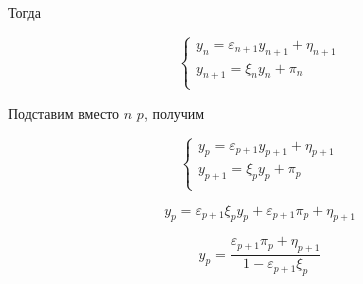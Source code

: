 Тогда

\begin{equation*}
    \begin{cases}
        y_n = \varepsilon_{n+1}y_{n+1}+\eta_{n+1} \\
        y_{n+1} = \xi_{n}y_{n} + \pi_{n} \\
    \end{cases}
\end{equation*}

Подставим вместо $n$ $p$, получим

\begin{equation*}
    \begin{cases}
        y_p = \varepsilon_{p+1}y_{p+1}+\eta_{p+1} \\
        y_{p+1} = \xi_{p}y_{p} + \pi_{p} \\
    \end{cases}
\end{equation*}

\begin{equation*}
    y_p = \varepsilon_{p+1}\xi_py_p + \varepsilon_{p+1}\pi_p + \eta_{p+1}
\end{equation*}

\begin{equation*}
    y_p = \frac{\varepsilon_{p+1}\pi_p + \eta_{p+1}}{1 - \varepsilon_{p+1}\xi_{p}}
\end{equation*}
